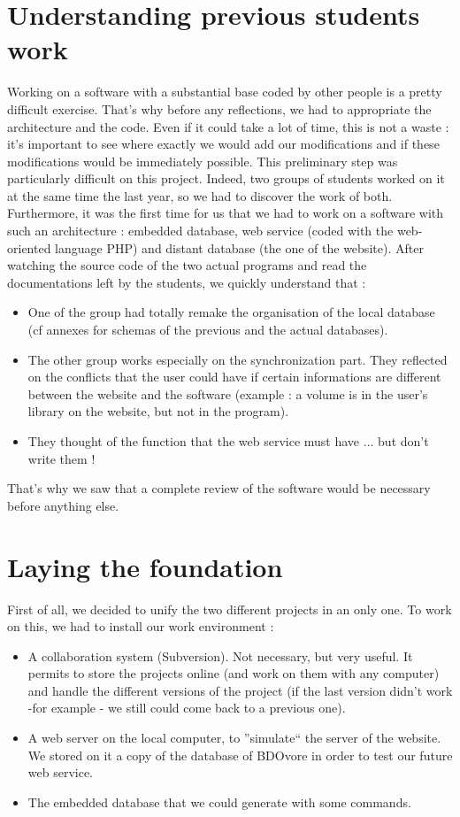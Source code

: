\documentclass[11pt]{report} %
\begin{document}
\section{Understanding previous students work}
Working on a software with a substantial base coded by other people is a pretty difficult exercise. That's why before any reflections, we had to appropriate the architecture and the code. Even if it could take a lot of time, this is not a waste : it's important to see where exactly we would add our modifications and if these modifications would be immediately possible. \newline
This preliminary step was particularly difficult on this project. Indeed, two groups of students worked on it at the same time the last year, so we had to discover the work of both. Furthermore, it was the first time for us that we had to work on a software with such an architecture : embedded database, web service (coded with the web-oriented language PHP) and distant database (the one of the website).\newline
After watching the source code of the two actual programs and read the documentations left by the students, we quickly understand that :

\begin{itemize}
\item One of the group had totally remake the organisation of the local database (cf annexes for schemas of the previous and the actual databases).
\item The other group works especially on the synchronization part. They reflected on the conflicts that the user could have if certain informations are different between the website and the software (example : a volume is in the user's library on the website, but not in the program).
\item They thought of the function that the web service must have ... but don't write them !
\end{itemize}

That's why we saw that a complete review of the software would be necessary before anything else.

\section{Laying the foundation}
First of all, we decided to unify the two different projects in an only one. To work on this, we had to install our work environment :

\begin{itemize}
\item A collaboration system (Subversion). Not necessary, but very useful. It permits to store the projects online (and work on them with any computer) and handle the different versions of the project (if the last version didn't work -for example - we still could come back to a previous one).
\item A web server on the local computer, to ''simulate`` the server of the website. We stored on it a copy of the database of BDOvore in order to test our future web service.
\item The embedded database that we could generate with some commands.
\end{itemize}
\end{document}
